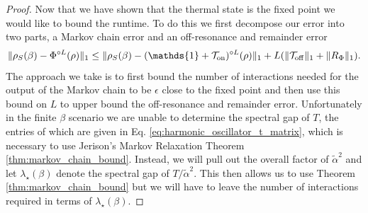 \documentclass{article}
\newcommand{\on}{\rm on}
\newcommand{\off}{\rm off}
\newcommand{\norm}[1]{\| #1 \|}
\newcommand{\TT}{\mathcal{T}}
\newcommand{\identity}{\mathds{1}}
\begin{document}
\begin{proof}
    Now that we have shown that the thermal state is the fixed point we would like to bound the runtime. To do this we first decompose our error into two parts, a Markov chain error and an off-resonance and remainder error
    \begin{equation}
        \norm{\rho_S(\beta) - \Phi^{\circ L}(\rho)}_1 \le \norm{\rho_S(\beta) - (\identity + \TT_{\on})^{\circ L}(\rho)}_1 + L(\norm{\TT_{\off}}_1 + \norm{R_{\Phi}}_1 ). \label{eq:harmonic_oscillator_error_breakdown}
    \end{equation}
    The approach we take is to first bound the number of interactions needed for the output of the Markov chain to be $\epsilon$ close to the fixed point and then use this bound on $L$ to upper bound the off-resonance and remainder error. Unfortunately in the finite $\beta$ scenario we are unable to determine the spectral gap of $T$, the entries of which are given in Eq. \eqref{eq:harmonic_oscillator_t_matrix}, which is necessary to use Jerison's Markov Relaxation Theorem \ref{thm:markov_chain_bound}. Instead, we will pull out the overall factor of $\widetilde{\alpha}^2$ and let $\lambda_\star(\beta)$ denote the spectral gap of $T/\widetilde{\alpha}^2$. This then allows us to use Theorem \ref{thm:markov_chain_bound} but we will have to leave the number of interactions required in terms of $\lambda_\star(\beta)$.


\end{proof}
\end{document}
